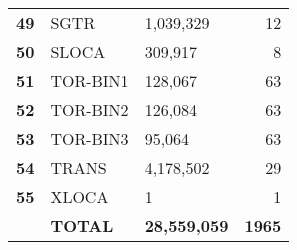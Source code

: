 \begin{longtable}{@{}rllr@{}}
\textbf{49} & SGTR             & 1,039,329 & 12 \\
\textbf{50} & SLOCA            & 309,917   & 8  \\
\textbf{51} & TOR-BIN1         & 128,067   & 63 \\
\textbf{52} & TOR-BIN2         & 126,084   & 63 \\
\textbf{53} & TOR-BIN3         & 95,064    & 63 \\
\textbf{54} & TRANS            & 4,178,502 & 29 \\
\textbf{55} & XLOCA            & 1         & 1  \\
\textbf{}                       & \textbf{TOTAL}       & \multicolumn{1}{l}{\textbf{28,559,059}} & \textbf{1965}                          \\* \bottomrule
\end{longtable}